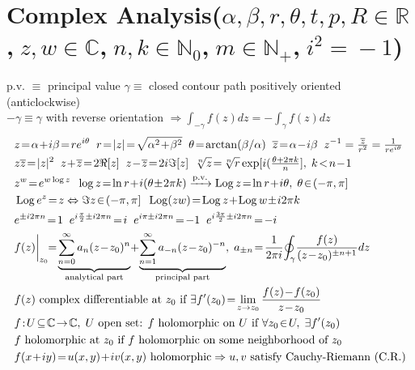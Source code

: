 \section*{Complex Analysis\normalfont\scriptsize{($\alpha,\beta,r,\theta,t,p,R\!\in\!\mathbb{R}$,$\;z,w\!\in\!\mathbb{C}$,$\;n,k\!\in\!\mathbb{N}_0$,$\;m\!\in\!\mathbb{N}_+$,$\;i^2\!=\!-1$)}}
\normalfont\scriptsize{ p.v. $\equiv$\! principal value \; $\gamma \equiv$ closed contour path positively oriented (anticlockwise)}\\
\normalfont\scriptsize{$-\gamma\equiv \gamma$ with reverse orientation $\Rightarrow\int_{-\gamma} f(z)dz= -\int_{\gamma}f(z)dz$}
\begin{align*}
&z\!=\!\alpha\!+\!i\beta\!=\!re^{i\theta}\;\;r\!=\!|z|\!=\!\sqrt{\alpha^2\!+\!\beta^2}\;\;\theta\!=\!\arctan(\beta/\alpha)\;\;\overline{z}\!=\!\alpha\!-\!i\beta \; \; z^{-1}=\tfrac{\overline{z}}{r^{2}} = \tfrac{1}{re^{i\theta}}\\
&z\overline{z}\!=\!|z|^2\;\;z\!+\!\overline{z}\!=\!2\Re[z]\;\;z\!-\!\overline{z}\!=\!2i\Im[z]\;\;\sqrt[n]{z}\!=\!\sqrt[n]{r}\exp[i(\tfrac{\theta+2\pi k}{n}],\;k\!<\!n\!-\!1 \\
&z^w\!=\!e^{w\log z}\;\;\log z\!=\!\ln r\!+\!i(\theta\!\pm\!2\pi k)\xrightarrow{\text{p.v.}}\operatorname{Log}z\!=\!\ln r\!+\!i\theta,\;\theta\!\in\!(-\pi,\pi] \\
&\operatorname{Log}e^z\!=\!z\Leftrightarrow\Im z\!\in\!(-\pi,\pi]\;\;\operatorname{Log}(zw)\!=\!\operatorname{Log}z\!+\!\operatorname{Log}w\!\pm\!i2\pi k \\
&e^{\pm i2\pi n}\!=\!1\;\;e^{i\frac{\pi}{2}\pm i2\pi n}\!=\!i\;\;e^{i\pi\pm i2\pi n}\!=\!-1\;\;e^{i\frac{3\pi}{2}\pm i2\pi n}\!=\!-i \\
&f(z)\bigg|_{z_0}\!\!=\!\underbrace{\sum_{n=0}^\infty a_n(z\!-\!z_0)^n}_{\text{\scriptsize analytical part}}\!+\!\underbrace{\sum_{n=1}^\infty a_{-n}(z\!-\!z_0)^{-n}}_{\text{\scriptsize principal part}},\;a_{\pm n}\!=\!\frac{1}{2\pi i}\!\oint_\gamma\!\frac{f(z)}{(z\!-\!z_0)^{\pm n+1}}dz \\
&\text{$f(z)$ complex differentiable at $z_0$ if }\exists f'(z_0)\!=\!\lim_{z\to z_0}\frac{f(z)\!-\!f(z_0)}{z\!-\!z_0} \\
&f\!:\!U\!\subseteq\!\mathbb{C}\!\to\!\mathbb{C},\;U\text{ open set: $f$ holomorphic on $U$ if }\forall z_0\!\in\!U,\;\exists f'(z_0) \\
&\text{$f$ holomorphic at $z_0$ if $f$ holomorphic on some neighborhood of $z_0$} \\
&f(x\!+\!iy)\!=\!u(x,y)\!+\!iv(x,y)\text{ holomorphic}\Rightarrow u,v\text{ satisfy Cauchy-Riemann (C.R.)} \\

\end{align*}
